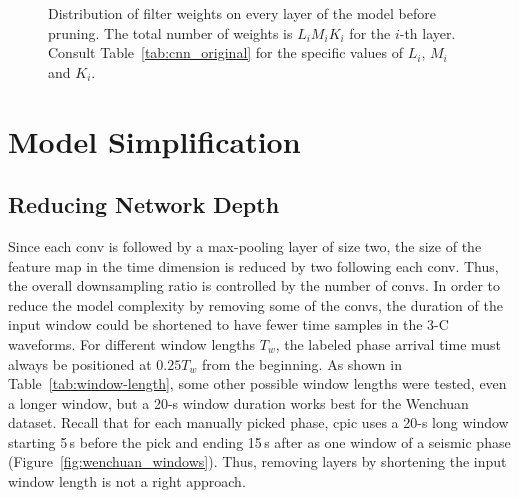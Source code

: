 \documentclass{article}
\begin{document}
\begin{figure}
\begin{subfigure}{0.48\linewidth}
        \caption{}
    \end{subfigure}
    \caption{Distribution of filter weights on every layer of the  model before pruning. The total number of weights is $L_i M_i K_i$ for the $i$-th layer. Consult Table~\ref{tab:cnn_original} for the specific values of $L_i$, $M_i$ and $K_i$.}
    \label{fig:weight_distribution}
\end{figure}

\section{Model Simplification}
\label{sec:simplification}

\subsection{Reducing Network Depth}
\label{sec:network_depth}
%
Since each \gls{conv} is followed by a max-pooling layer of size two, the size of the feature map in the time dimension is reduced by two following each \gls{conv}.
Thus, the overall downsampling ratio is controlled by the number of \glspl{conv}.
In order to reduce the model complexity by removing some of the \glspl{conv}, the duration of the input window could be shortened to have fewer time samples in the 3-C waveforms.
For different window lengths $T_w$, the labeled phase arrival time must always be positioned at $0.25T_w$ from the beginning.
As shown in Table~\ref{tab:window-length}, some other possible window lengths were tested, even a longer window, but a 20-s window duration works best for the Wenchuan dataset.
Recall that for each manually picked phase, \gls{cpic} uses a 20-s long window starting 5\,s before the pick and ending 15\,s after as one window of a seismic phase (Figure~\ref{fig:wenchuan_windows}).
Thus, removing layers by shortening the input window length is not a right approach.
\end{document}
